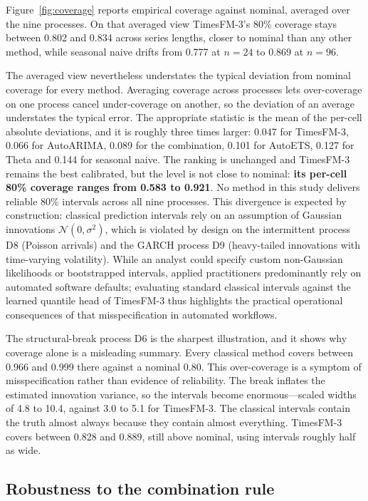 \documentclass[article]{ajs}
\providecommand{\figureref}[1]{Figure~\ref{#1}}
\begin{document}
\figureref{fig:coverage} reports empirical coverage against nominal, averaged over the nine
processes. On that averaged view TimesFM-3's 80\% coverage stays between 0.802 and 0.834 across
series lengths, closer to nominal than any other method, while seasonal naive drifts from 0.777
at $n = 24$ to 0.869 at $n = 96$.

The averaged view nevertheless understates the typical deviation from nominal coverage for
every method. Averaging coverage across processes lets over-coverage on one process cancel
under-coverage on another, so the deviation of an average understates the typical error. The
appropriate statistic is the mean of the per-cell absolute deviations, and it is roughly three
times larger: 0.047 for TimesFM-3, 0.066 for AutoARIMA, 0.089 for the combination, 0.101 for
AutoETS, 0.127 for Theta and 0.144 for seasonal naive. The ranking is unchanged and TimesFM-3
remains the best calibrated, but the level is not close to nominal: \textbf{its per-cell 80\%
coverage ranges from 0.583 to 0.921}. No method in this study delivers reliable 80\% intervals
across all nine processes. This divergence is expected by construction: classical prediction intervals rely on an assumption of
Gaussian innovations $\mathcal{N}(0, \sigma^2)$, which is violated by design on the intermittent
process D8 (Poisson arrivals) and the GARCH process D9 (heavy-tailed innovations with time-varying volatility).
While an analyst could specify custom non-Gaussian likelihoods or bootstrapped intervals, applied practitioners
predominantly rely on automated software defaults; evaluating standard classical intervals against the
learned quantile head of TimesFM-3 thus highlights the practical operational consequences of that misspecification in automated workflows.

The structural-break process D6 is the sharpest illustration, and it shows why coverage alone
is a misleading summary. Every classical method covers between 0.966 and 0.999 there against a
nominal 0.80. This over-coverage is a symptom of misspecification rather than evidence of reliability. The break inflates the estimated
innovation variance, so the intervals become enormous---scaled widths of 4.8 to 10.4, against
3.0 to 5.1 for TimesFM-3. The classical intervals contain the truth almost always because they
contain almost everything. TimesFM-3 covers between 0.828 and 0.889, still above nominal, using
intervals roughly half as wide.

\subsection{Robustness to the combination rule}
\label{sec:combination}
\end{document}
